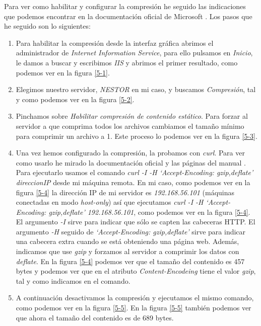 \documentclass[a4paper,titlepage,12pt]{scrartcl}	%
\numberwithin{figure}{section} %
\numberwithin{table}{section} %
\begin{document}
	Para ver como habilitar y configurar la compresión he seguido las indicaciones que podemos encontrar en la documentación oficial de Microsoft \cite{compresionISS}. Los pasos que he seguido son lo siguientes:
	\begin{enumerate}
		\item Para habilitar la compresión desde la interfaz gráfica abrimos el administrador de \textit{Internet Information Service}, para ello pulsamos en \textit{Inicio}, le damos a buscar y escribimos \textit{IIS} y abrimos el primer resultado, como podemos ver en la figura \ref{5-1}.
		\item Elegimos nuestro servidor, \textit{NESTOR} en mi caso, y buscamos \textit{Compresión}, tal y como podemos ver en la figura \ref{5-2}.
		\item Pinchamos sobre \textit{Habilitar compresión de contenido estático}. Para forzar al servidor a que comprima todos los archivos cambiamos el tamaño mínimo para comprimir un archivo a 1. Este proceso lo podemos ver en la figura \ref{5-3}.
		\item Una vez hemos configurado la compresión, la probamos con \textit{curl}. Para ver como usarlo he mirado la documentación oficial \cite{curl} y las páginas del manual \cite{curl2}. Para ejecutarlo usamos el comando \textit{curl -I -H `Accept-Encoding: gzip,deflate' direccionIP} desde mi máquina remota. En mi caso, como podemos ver en la figura \ref{5-4} la dirección IP de mi servidor es \textit{192.168.56.101} (máquinas conectadas en modo \textit{host-only}) así que ejecutamos \textit{curl -I -H `Accept-Encoding: gzip,deflate' 192.168.56.101}, como podemos ver en la figura \ref{5-4}. El argumento \textit{-I} sirve para indicar que sólo se capten las cabeceras HTTP. El argumento \textit{-H} seguido de \textit{`Accept-Encoding: gzip,deflate'} sirve para indicar una cabecera extra cuando se está obteniendo una página web. Además, indicamos que use \textit{gzip} y forzamos al servidor a comprimir los datos con \textit{deflate}. En la figura \ref{5-4} podemos ver que el tamaño del contenido es 457  bytes y podemos ver que en el atributo \textit{Content-Encodeing} tiene el valor \textit{gzip}, tal y como indicamos en el comando.
		\item A continuación desactivamos la compresión y ejecutamos el mismo comando, como podemos ver en la figura \ref{5-5}. En la figura \ref{5-5} también podemos ver que ahora el tamaño del contenido es de 689 bytes.
	\end{enumerate}
		
\end{document}
